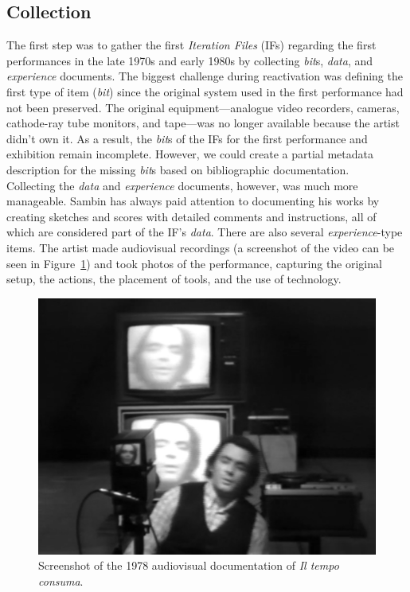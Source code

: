 \subsection*{Collection}
The first step was to gather the first \textit{Iteration Files} (IFs) regarding the first performances in the late 1970s and early 1980s by collecting \textit{bit}s, \textit{data}, and \textit{experience} documents. The biggest challenge during reactivation was defining the first type of item (\textit{bit}) since the original system used in the first performance had not been preserved. The original equipment—analogue video recorders, cameras, cathode-ray tube monitors, and tape—was no longer available because the artist didn’t own it. As a result, the \textit{bit}s of the IFs for the first performance and exhibition remain incomplete. However, we could create a partial metadata description for the missing \textit{bit}s based on bibliographic documentation.\\
Collecting the \textit{data} and \textit{experience} documents, however, was much more manageable. Sambin has always paid attention to documenting his works by creating sketches and scores with detailed comments and instructions, all of which are considered part of the IF’s \textit{data}. There are also several \textit{experience}-type items. The artist made audiovisual recordings (a screenshot of the video can be seen in Figure~\ref{fig:aa-iltempoconsuma01}) and took photos of the performance, capturing the original setup, the actions, the placement of tools, and the use of technology.
\begin{figure}[!h]
    \centering
    \includegraphics[width=\linewidth]{chapters/appendix/a/image/figa-iltempoconsuma.jpg}
    \caption{Screenshot of the 1978 audiovisual documentation of \textit{Il tempo consuma}.}
    \label{fig:aa-iltempoconsuma01}
\end{figure}
